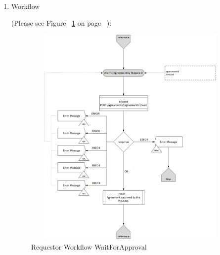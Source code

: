 \begin{enumerate}

\item Workflow

(Please see Figure ~\ref{fig:RWW} on page ~\pageref{fig:RWW}):

\begin{figure}[H]
    \centering
    \includegraphics[width=11cm,height=11cm,angle=0]{./diag/Workflow/Market/WaitForAgreement-R-Workflow.png}
    \caption{Requestor Workflow WaitForApproval }
	\label{fig:RWW}
\end{figure}

\end{enumerate}

\newpage



